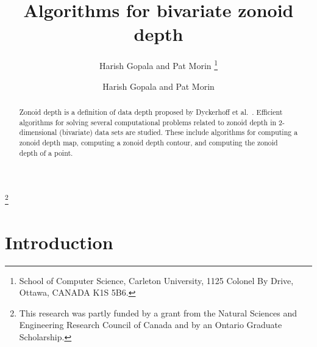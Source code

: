 \documentclass{elsart}
\author{Harish Gopala and Pat Morin%
	\thanks{School of Computer Science,
		Carleton University, 
		1125 Colonel By Drive, 
		Ottawa, CANADA K1S 5B6.
   		\email{\{hgopala,morin\}@scs.carleton.ca}
	}
}
\date{}
\begin{document}
\begin{frontmatter}
\title{Algorithms for bivariate zonoid depth}
\author{Harish Gopala and Pat Morin}
\address{School of Computer Science, Carleton University \\
	1125 Colonel By Drive, Ottawa, CANADA K1S~5B6}

\thanks[funding]{This research was partly funded by a grant from the
Natural Sciences and Engineering Research Council of Canada and by an
Ontario Graduate Scholarship.}

\begin{abstract}
Zonoid depth is a definition of data depth proposed by Dyckerhoff et
al.\ \cite{zonoid_data_depth_theory_and_computation}. 
Efficient algorithms for solving several computational problems
related to zonoid depth
in 2-dimensional (bivariate) data sets are studied. These include algorithms
for computing a zonoid depth map, computing a zonoid depth contour,
and computing the zonoid depth of a point.
\end{abstract}
\end{frontmatter}

\section{Introduction}\label{section_introduction}
\end{document}
